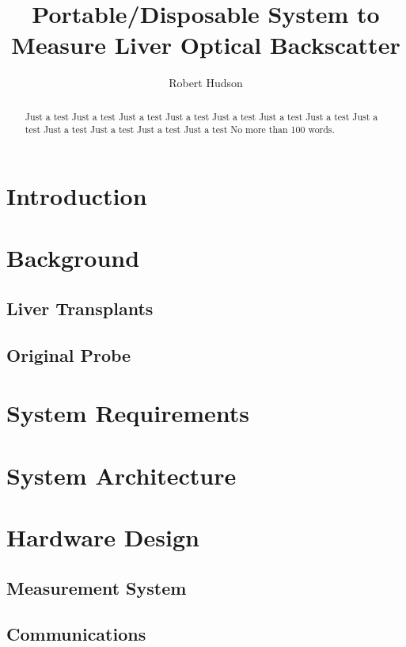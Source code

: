 \documentclass{IIBproject}
\begin{document}
\author{Robert Hudson}
\title{Portable/Disposable System to Measure Liver Optical Backscatter}
\maketitle
\thispagestyle{empty}


\begin{abstract}
Just a test Just a test Just a test Just a test Just a test Just a test 
Just a test Just a test Just a test Just a test Just a test Just a test 
No more than 100 words.
\end{abstract}

\newpage
\tableofcontents
\newpage
\pagestyle{plain}

\section{Introduction}

\section{Background}
\subsection{Liver Transplants}
\subsection{Original Probe}

\section{System Requirements}

\section{System Architecture}

\section{Hardware Design}

\subsection{Measurement System}

\subsection{Communications}
\end{document}
